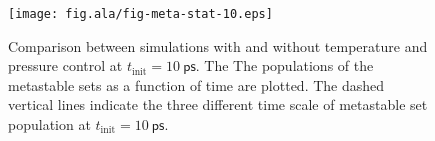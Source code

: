 \documentclass[a4paper,preprint,onecolumn]{revtex4-1}
\newcommand{\ex}{{\textrm{ex}}}
\begin{document}
\begin{figure}
  \centering
  \texttt{[image: fig.ala/fig-meta-stat-10.eps]}
  \caption{ Comparison between simulations with and without
    temperature and pressure control at $t_{\textrm{init}} =
    10~\textsf{ps}$. The The populations of the metastable sets as a
    function of time are plotted.  The dashed vertical lines indicate
    the three different time scale of metastable set population at
    $t_{\textrm{init}} = 10~\textsf{ps}$.}
  \label{fig:tmp6}
\end{figure}





\end{document}
